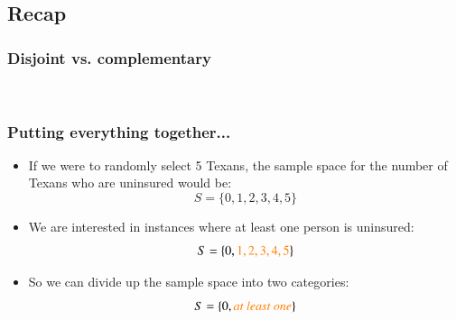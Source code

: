 
\subsection{Recap}


\begin{frame}
\frametitle{Disjoint vs. complementary}


\pause


\pause
$\:$ \\


\pause


\end{frame}


\begin{frame}
\frametitle{Putting everything together...}


\begin{itemize}

\item If we were to randomly select 5 Texans, the sample space for the number of Texans who are uninsured would be:
\[ S = \{0, 1, 2, 3, 4, 5\} \]

\item We are interested in instances where at least one person is uninsured:
\[ S = \{0, \textit{\textcolor{orange}{$1, 2, 3, 4, 5$}} \} \]

\item So we can divide up the sample space into two categories:
\[ S = \{0, \textit{\textcolor{orange}{at~least~one}} \} \]

\end{itemize}

\end{frame}


